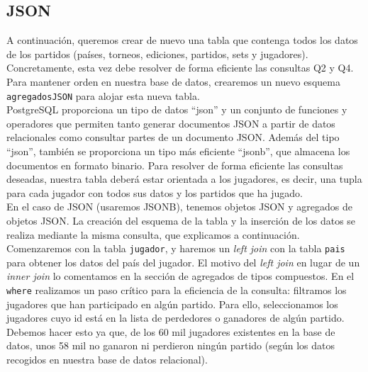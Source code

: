 \subsection{JSON}

A continuación, queremos crear de nuevo una tabla que contenga todos los datos de los partidos (países, torneos, ediciones, partidos, sets y jugadores). Concretamente, esta vez debe resolver de forma eficiente las consultas Q2 y Q4. Para mantener orden en nuestra base de datos, crearemos un nuevo esquema \texttt{agregadosJSON} para alojar esta nueva tabla. \\

PostgreSQL proporciona un tipo de datos ``json'' y un conjunto de funciones y operadores que permiten tanto generar documentos JSON a partir de datos relacionales como consultar partes de un documento JSON. Además del tipo ``json'', también se proporciona un tipo más eficiente ``jsonb'', que almacena los documentos en formato binario. Para resolver de forma eficiente las consultas deseadas, nuestra tabla deberá estar orientada a los jugadores, es decir, una tupla para cada jugador con todos sus datos y los partidos que ha jugado. \\

En el caso de JSON (usaremos JSONB), tenemos objetos JSON y agregados de objetos JSON. La creación del esquema de la tabla y la inserción de los datos se realiza mediante la misma consulta, que explicamos a continuación.  \\


Comenzaremos con la tabla \texttt{jugador}, y haremos un \textit{left join} con la tabla \texttt{pais} para obtener los datos del país del jugador. El motivo del \textit{left join} en lugar de un \textit{inner join} lo comentamos en la sección de agregados de tipos compuestos. En el \texttt{where} realizamos un paso crítico para la eficiencia de la consulta: filtramos los jugadores que han participado en algún partido. Para ello, seleccionamos los jugadores cuyo id está en la lista de perdedores o ganadores de algún partido. Debemos hacer esto ya que, de los 60 mil jugadores existentes en la base de datos, unos 58 mil no ganaron ni perdieron ningún partido (según los datos recogidos en nuestra base de datos relacional). \\

